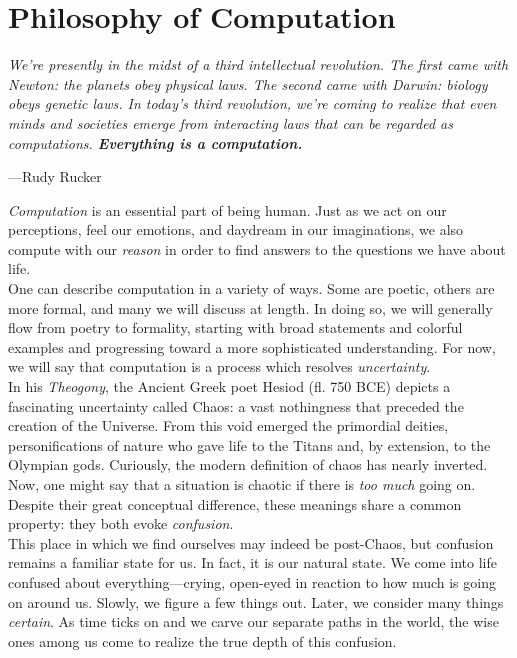 \part{Philosophy of Computation}

\vspace{4mm}
\begin{displayquote}
    \textit{We're presently in the midst of a third intellectual revolution. The first came with Newton: the planets obey physical laws. The second came with Darwin: biology obeys genetic laws. In today’s third revolution, we're coming to realize that even minds and societies emerge from interacting laws that can be regarded as computations. \textbf{Everything is a computation.}}
    \vspace{2mm}
    \begin{flushright}
        ---Rudy Rucker
    \end{flushright}
\end{displayquote}
\vspace{4mm}

\textit{Computation} is an essential part of being human. Just as we act on our perceptions, feel our emotions, and daydream in our imaginations, we also compute with our \textit{reason} in order to find answers to the questions we have about life. \\

One can describe computation in a variety of ways. Some are poetic, others are more formal, and many we will discuss at length. In doing so, we will generally flow from poetry to formality, starting with broad statements and colorful examples and progressing toward a more sophisticated understanding. For now, we will say that computation is a process which resolves \textit{uncertainty}. \\

In his \textit{Theogony}, the Ancient Greek poet Hesiod (fl. 750 BCE) depicts a fascinating uncertainty called Chaos: a vast nothingness that preceded the creation of the Universe. From this void emerged the primordial deities, personifications of nature who gave life to the Titans and, by extension, to the Olympian gods. Curiously, the modern definition of chaos has nearly inverted. Now, one might say that a situation is chaotic if there is \textit{too much} going on. Despite their great conceptual difference, these meanings share a common property: they both evoke \textit{confusion}. \\

This place in which we find ourselves may indeed be post-Chaos, but confusion remains a familiar state for us. In fact, it is our natural state. We come into life confused about everything---crying, open-eyed in reaction to how much is going on around us. Slowly, we figure a few things out. Later, we consider many things \textit{certain}. As time ticks on and we carve our separate paths in the world, the wise ones among us come to realize the true depth of this confusion. \\

